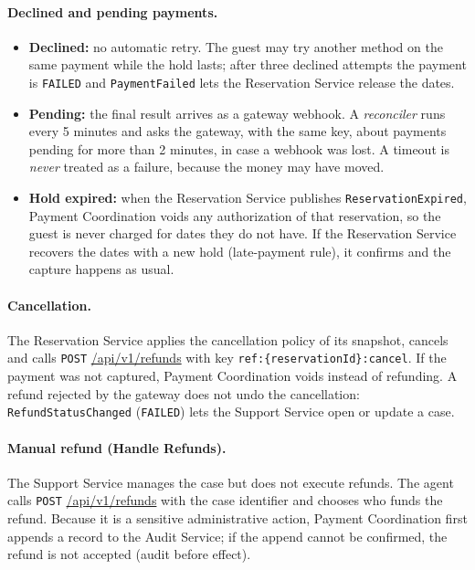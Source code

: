 \paragraph{Declined and pending payments.}
\begin{itemize}
  \item \textbf{Declined:} no automatic retry. The guest may try another
    method on the same payment while the hold lasts; after three declined
    attempts the payment is \texttt{FAILED} and \texttt{Payment\allowbreak Failed} lets the
    Reservation Service release the dates.
  \item \textbf{Pending:} the final result arrives as a gateway webhook. A
    \emph{reconciler} runs every 5 minutes and asks the gateway, with the same
    key, about payments pending for more than 2 minutes, in case a webhook was
    lost. A timeout is \emph{never} treated as a failure, because the money may
    have moved.
  \item \textbf{Hold expired:} when the Reservation Service publishes
    \texttt{Reservation\allowbreak Expired}, Payment Coordination voids any authorization
    of that reservation, so the guest is never charged for dates they do not
    have. If the Reservation Service recovers the dates with a new hold
    (late-payment rule), it confirms and the capture happens as usual.
\end{itemize}

\paragraph{Cancellation.} The Reservation Service applies the cancellation
policy of its snapshot, cancels and calls \texttt{POST} \url{/api/v1/refunds} with
key \texttt{ref:\allowbreak \{reservation\allowbreak Id\}:\allowbreak cancel}. If the payment was not captured,
Payment Coordination voids instead of refunding. A refund rejected by the
gateway does not undo the cancellation: \texttt{Refund\allowbreak Status\allowbreak Changed}
(\texttt{FAILED}) lets the Support Service open or update a case.

\paragraph{Manual refund (Handle Refunds).} The Support Service manages the
case but does not execute refunds. The agent calls
\texttt{POST} \url{/api/v1/refunds} with the case identifier and chooses who funds
the refund. Because it is a sensitive administrative action, Payment
Coordination first appends a record to the Audit Service; if the append
cannot be confirmed, the refund is not accepted (audit before effect).

